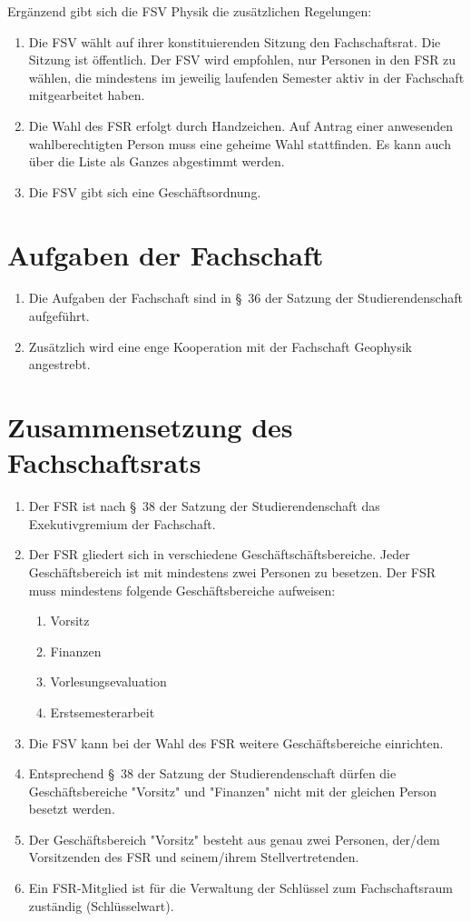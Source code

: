 Ergänzend gibt sich die FSV Physik die zusätzlichen Regelungen:
\begin{enumerate}
	\item Die FSV wählt auf ihrer konstituierenden Sitzung den Fachschaftsrat. Die Sitzung ist öffentlich.
	Der FSV wird empfohlen, nur Personen in den FSR zu wählen, die mindestens im jeweilig laufenden Semester aktiv in der Fachschaft mitgearbeitet haben.
	\item Die Wahl des FSR erfolgt durch Handzeichen. Auf Antrag einer anwesenden wahlberechtigten Person muss eine geheime Wahl stattfinden. Es kann auch über die Liste als Ganzes abgestimmt werden.
	\item Die FSV gibt sich eine Geschäftsordnung.
\end{enumerate}

\section{Aufgaben der Fachschaft}
\begin{enumerate}
	\item Die Aufgaben der Fachschaft sind in §~36 der Satzung der Studierendenschaft aufgeführt.
	\item Zusätzlich wird eine enge Kooperation mit der Fachschaft Geophysik angestrebt.
\end{enumerate}

\section{Zusammensetzung des Fachschaftsrats}
\begin{enumerate}
	\item Der FSR ist nach §~38 der Satzung der Studierendenschaft das Exekutivgremium der Fachschaft.
	\item Der FSR gliedert sich in verschiedene Geschäftschäftsbereiche. Jeder Geschäftsbereich ist mit mindestens zwei Personen zu besetzen. Der FSR muss mindestens folgende Geschäftsbereiche aufweisen:
	\begin{enumerate}
		\item Vorsitz
		\item Finanzen
		\item Vorlesungsevaluation
		\item Erstsemesterarbeit
	\end{enumerate}
	\item Die FSV kann bei der Wahl des FSR weitere Geschäftsbereiche einrichten.
	\item Entsprechend §~38 der Satzung der Studierendenschaft dürfen die Geschäftsbereiche "Vorsitz" und "Finanzen" nicht mit der gleichen Person besetzt werden.
	\item Der Geschäftsbereich "Vorsitz" besteht aus genau zwei Personen, der/dem Vorsitzenden des FSR und seinem/ihrem Stellvertretenden.
	\item Ein FSR-Mitglied ist für die Verwaltung der Schlüssel zum Fachschaftsraum zuständig (Schlüsselwart).
\end{enumerate}

